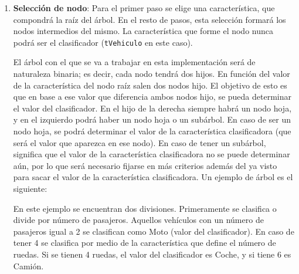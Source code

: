 \documentclass[12pt]{report}\usepackage[]{graphicx}\usepackage[dvipsnames]{xcolor}
\begin{document}
	 			\begin{enumerate}[label = \textbf{\arabic*.}]
	 				\item \textbf{Selección de nodo}: Para el primer paso se elige una característica, que compondrá la raíz del árbol. En el resto de pasos, esta selección formará los nodos intermedios del mismo. La característica que forme el nodo nunca podrá ser el clasificador (\texttt{tVehiculo} en este caso).
	 				
	 				El árbol con el que se va a trabajar en esta implementación será de naturaleza binaria; es decir, cada nodo tendrá dos hijos. En función del valor de la característica del nodo raíz salen dos nodos hijo. El objetivo de esto es que en base a ese valor que diferencia ambos nodos hijo, se pueda determinar el valor del clasificador. En el hijo de la derecha siempre habrá un nodo hoja, y en el izquierdo podrá haber un nodo hoja o un subárbol. En caso de ser un nodo hoja, se podrá determinar el valor de la característica clasificadora (que será el valor que aparezca en ese nodo). En caso de tener un subárbol, significa que el valor de la característica clasificadora no se puede determinar aún, por lo que será necesario fijarse en más criterios además del ya visto para sacar el valor de la característica clasificadora. Un ejemplo de árbol es el siguiente:
	 				
	 				\begin{center}
	 				\end{center}
	 				
	 				En este ejemplo se encuentran dos divisiones. Primeramente se clasifica o divide por número de pasajeros. Aquellos vehículos con un número de pasajeros igual a 2 se clasifican como Moto (valor del clasificador). En caso de tener 4 se clasifica por medio de la característica que define el número de ruedas. Si se tienen 4 ruedas, el valor del clasificador es Coche, y si tiene 6 es Camión.\\
	 				

\end{enumerate}
\end{document}
